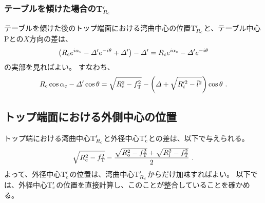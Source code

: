 \subsubsection{テーブルを傾けた場合のT\texorpdfstring{$_{R_\text c}'$}{Rc'}}
テーブルを傾けた後のトップ端面における湾曲中心の位置T$_{R_\text c}'$と、テーブル中心Pとの$X$方向の差は、
\begin{align*}
  \left(R_\text ce^{i\alpha_\text c}-\varDelta'e^{-i\theta}+\varDelta'\right)-\varDelta'
  = R_\text ce^{i\alpha_\text c}-\varDelta'e^{-i\theta}
\end{align*}
の実部を見ればよい。
すなわち、
\begin{align}
  \label{eq:tableTRc}
  R_\text c\cos\alpha_\text c-\varDelta'\cos\theta
  = \sqrt{R_\text c^2-f_\text T^2}-\left(\varDelta+\sqrt{R_i'^2-\bar l^2}\right)\cos\theta~.
\end{align}



\subsection{トップ端面における外側中心の位置}
トップ端における湾曲中心T$_{R_\text c}'$と外径中心T$_\text c'$との差は、以下で与えられる。
\begin{align}
  \label{eq:TRc-Tc}
  \sqrt{R_\text c^2-f_\text T^2}-\frac{\sqrt{R_\text o^2-f_\text T^2}+\sqrt{R_\text i^2-f_\text T^2}}2\ .
\end{align}
よって、外径中心T$_\text c'$の位置は、湾曲中心T$_{R_\text c}'$からだけ加味すればよい。
以下では、外径中心T$_\text c'$の位置を直接計算し、このことが整合していることを確かめる。



